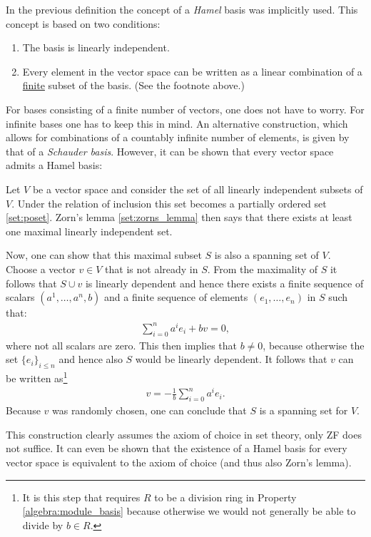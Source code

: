     \begin{remark}
        In the previous definition the concept of a \textit{Hamel} basis was implicitly used. This concept is based on two conditions:
        \begin{enumerate}
            \item The basis is linearly independent.
            \item Every element in the vector space can be written as a linear combination of a \underline{finite} subset of the basis. (See the footnote above.)
        \end{enumerate}
        For bases consisting of a finite number of vectors, one does not have to worry. For infinite bases one has to keep this in mind. An alternative construction, which allows for combinations of a countably infinite number of elements, is given by that of a \textit{Schauder basis}. However, it can be shown that every vector space admits a Hamel basis:
    \end{remark}
    \begin{construct}\label{linalgebra:hamel_basis}
        Let $V$ be a vector space and consider the set of all linearly independent subsets of $V$. Under the relation of inclusion this set becomes a partially ordered set \ref{set:poset}. Zorn's lemma \ref{set:zorns_lemma} then says that there exists at least one maximal linearly independent set.

        Now, one can show that this maximal subset $S$ is also a spanning set of $V$. Choose a vector $v\in V$ that is not already in $S$. From the maximality of $S$ it follows that $S\cup v$ is linearly dependent and hence there exists a finite sequence of scalars $(a^1,\ldots,a^n,b)$ and a finite sequence of elements $(e_1,\ldots,e_n)$ in $S$ such that:
        \begin{gather}
            \sum_{i=0}^n a^ie_i + bv = 0,
        \end{gather}
        where not all scalars are zero. This then implies that $b\neq0$, because otherwise the set $\{e_i\}_{i\leq n}$ and hence also $S$ would be linearly dependent. It follows that $v$ can be written as\footnote{It is this step that requires $R$ to be a division ring in Property \ref{algebra:module_basis} because otherwise we would not generally be able to divide by $b\in R$.}
        \begin{gather}
            v = -\frac{1}{b}\sum_{i=0}^na^ie_i.
        \end{gather}
        Because $v$ was randomly chosen, one can conclude that $S$ is a spanning set for $V$.
    \end{construct}
    \begin{remark*}
        This construction clearly assumes the axiom of choice in set theory, only ZF does not suffice. It can even be shown that the existence of a Hamel basis for every vector space is equivalent to the axiom of choice (and thus also Zorn's lemma).
    \end{remark*}

